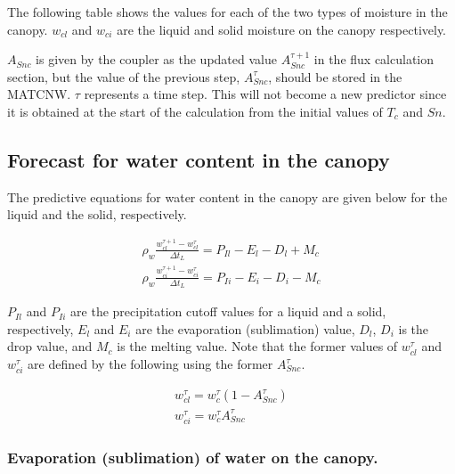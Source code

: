 The following table shows the values for each of the two types of
moisture in the canopy. \(w_{cl}\) and \(w_{ci}\) are the liquid and
solid moisture on the canopy respectively.

\(A_{Snc}\) is given by the coupler as the updated value
\(A_{Snc}^{\tau+1}\) in the flux calculation section, but the value of
the previous step, \(A_{Snc}^{\tau}\), should be stored in the MATCNW.
\(\tau\) represents a time step. This will not become a new predictor
since it is obtained at the start of the calculation from the initial
values of \(T_c\) and \(Sn\).

\hypertarget{forecast-for-water-content-in-the-canopy}{%
\subsection{Forecast for water content in the
canopy}\label{forecast-for-water-content-in-the-canopy}}

The predictive equations for water content in the canopy are given below
for the liquid and the solid, respectively.

\begin{eqnarray}
 \rho_w \frac{w_{cl}^{\tau+1} - w_{cl}^{\tau}}{\Delta t_L}
  = P_{Il} - E_l - D_l + M_c \\
 \rho_w \frac{w_{ci}^{\tau+1} - w_{ci}^{\tau}}{\Delta t_L}
  = P_{Ii} - E_i - D_i - M_c
\end{eqnarray}

\(P_{Il}\) and \(P_{Ii}\) are the precipitation cutoff values for a
liquid and a solid, respectively, \(E_l\) and \(E_i\) are the
evaporation (sublimation) value, \(D_l\), \(D_i\) is the drop value, and
\(M_c\) is the melting value. Note that the former values of
\(w_{cl}^{\tau}\) and \(w_{ci}^{\tau}\) are defined by the following
using the former \(A_{Snc}^{\tau}\).

\begin{eqnarray}
 w_{cl}^{\tau} = w_c^{\tau} ( 1 - A_{Snc}^{\tau}) \\
 w_{ci}^{\tau} = w_c^{\tau} A_{Snc}^{\tau}
\end{eqnarray}

\hypertarget{evaporation-sublimation-of-water-on-the-canopy.}{%
\subsubsection{Evaporation (sublimation) of water on the
canopy.}\label{evaporation-sublimation-of-water-on-the-canopy.}}

